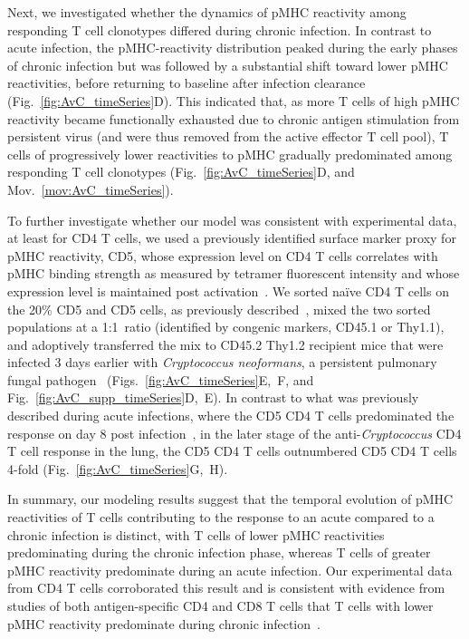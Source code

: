 Next, we investigated whether the dynamics of pMHC reactivity among responding T cell clonotypes differed during chronic infection. In contrast to acute infection, the pMHC-reactivity distribution peaked during the early phases of chronic infection but was followed by a substantial shift toward lower pMHC reactivities, before returning to baseline after infection clearance (Fig.~\ref{fig:AvC_timeSeries}D). This indicated that, as more T cells of high pMHC reactivity became functionally exhausted due to chronic antigen stimulation from persistent virus (and were thus removed from the active effector T cell pool), T cells of progressively lower reactivities to pMHC gradually predominated among responding T cell clonotypes (Fig.~\ref{fig:AvC_timeSeries}D, and Mov.~\ref{mov:AvC_timeSeries}).

To further investigate whether our model was consistent with experimental data, at least for CD4\pos{} T cells, we used a previously identified surface marker proxy for pMHC reactivity, CD5, whose expression level on CD4\pos{} T cells correlates with pMHC binding strength as measured by tetramer fluorescent intensity and whose expression level is maintained post activation~\cite{mandl2013t,azzam1998cd5,rogers2021pre}. We sorted na\"{i}ve CD4\pos{} T cells on the 20\% CD5 and CD5 cells, as previously described~\cite{mandl2013t,rogers2021pre}, mixed the two sorted populations at a 1:1~ratio (identified by congenic markers, CD45.1 or Thy1.1), and adoptively transferred the mix to CD45.2\pos{} Thy1.2\pos{} recipient mice that were infected 3 days earlier with \textit{Cryptococcus neoformans}, a persistent pulmonary fungal pathogen~\cite{schneider2020migration} (Figs.~\ref{fig:AvC_timeSeries}E,~F, and Fig.~\ref{fig:AvC_supp_timeSeries}D,~E). In contrast to what was previously described during acute infections, where the CD5 CD4\pos{} T cells predominated the response on day 8 post infection~\cite{mandl2013t}, in the later stage of the anti-\textit{Cryptococcus} CD4\pos{} T cell response in the lung, the CD5 CD4\pos{} T cells outnumbered CD5 CD4\pos{} T cells 4-fold (Fig.~\ref{fig:AvC_timeSeries}G,~H).

In summary, our modeling results suggest that the temporal evolution of pMHC reactivities of T cells contributing to the response to an acute compared to a chronic infection is distinct, with T cells of lower pMHC reactivities predominating during the chronic infection phase, whereas T cells of greater pMHC reactivity predominate during an acute infection. Our experimental data from CD4\pos{} T cells corroborated this result and is consistent with evidence from studies of both antigen-specific CD4\pos{} and CD8\pos{} T cells that T cells with lower pMHC reactivity predominate during chronic infection~\cite{gallegos2016control,schober2020reverse,tsitsiklis2020unusual}. 


